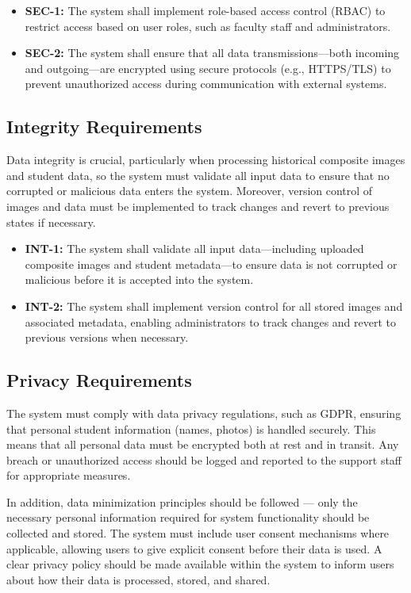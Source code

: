 \documentclass[12pt]{article}
\begin{document}
\begin{itemize}
    \item \textbf{SEC-1:} The system shall implement role-based access control (RBAC) to restrict access based on user roles, such as faculty staff and administrators.
    \item \textbf{SEC-2:} The system shall ensure that all data transmissions—both incoming and outgoing—are encrypted using secure protocols (e.g., HTTPS/TLS) to prevent unauthorized access during communication with external systems.
\end{itemize}

\subsection{Integrity Requirements}
Data integrity is crucial, particularly when processing historical composite images and student data, so the system must validate all input data to ensure that no corrupted or malicious data enters the system. Moreover, version control of images and data must be implemented to track changes and revert to previous states if necessary.

\begin{itemize}
    \item \textbf{INT-1:} The system shall validate all input data—including uploaded composite images and student metadata—to ensure data is not corrupted or malicious before it is accepted into the system.
    \item \textbf{INT-2:} The system shall implement version control for all stored images and associated metadata, enabling administrators to track changes and revert to previous versions when necessary.
\end{itemize}

\subsection{Privacy Requirements}
The system must comply with data privacy regulations, such as GDPR, ensuring that personal student information (names, photos) is handled securely. This means that all personal data must be encrypted both at rest and in transit. Any breach or unauthorized access should be logged and reported to the support staff for appropriate measures. 

In addition, data minimization principles should be followed — only the necessary personal information required for system functionality should be collected and stored. The system must include user consent mechanisms where applicable, allowing users to give explicit consent before their data is used. A clear privacy policy should be made available within the system to inform users about how their data is processed, stored, and shared.
\end{document}
